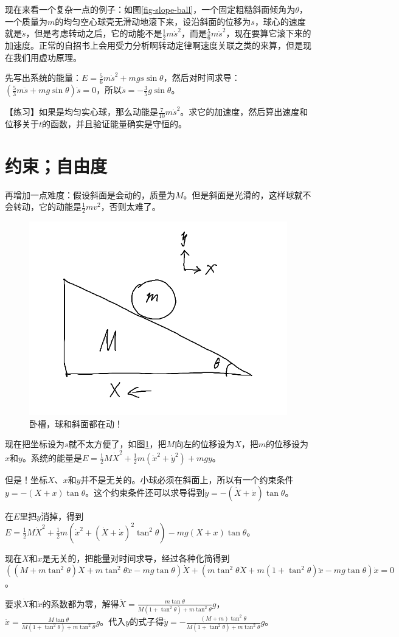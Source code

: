 现在来看一个复杂一点的例子：如图\ref{fig-slope-ball}，一个固定粗糙斜面倾角为$\theta$，一个质量为$m$的均匀空心球壳无滑动地滚下来，设沿斜面的位移为$s$，球心的速度就是$\dot s$，但是考虑转动之后，它的动能不是$\frac{1}{2} m \dot s^2$，而是$\frac{5}{6} m \dot s^2$，现在要算它滚下来的加速度。正常的自招书上会用受力分析啊转动定律啊速度关联之类的来算，但是现在我们用虚功原理。

先写出系统的能量：$E=\frac{5}{6} m \dot s^2+m g s \sin \theta$，然后对时间求导：$(\frac{5}{3} m \ddot s+m g \sin \theta) \dot s=0$，所以$\ddot s=-\frac{3}{5} g \sin \theta$。

【练习】如果是均匀实心球，那么动能是$\frac{7}{10} m \dot s^2$。求它的加速度，然后算出速度和位移关于$t$的函数，并且验证能量确实是守恒的。
\section{约束；自由度}
再增加一点难度：假设斜面是会动的，质量为$M$。但是斜面是光滑的，这样球就不会转动，它的动能是$\frac{1}{2} m v^2$，否则太难了。
\begin{figure}[htb]
\centering
\includegraphics[width=0.33\linewidth]{fig/slope-ball-2.png}
\caption{卧槽，球和斜面都在动！}
\label{fig-slope-ball-2}
\end{figure}

现在把坐标设为$s$就不太方便了，如图\ref{fig-slope-ball-2}，把$M$向左的位移设为$X$，把$m$的位移设为$x$和$y$。系统的能量是$E=\frac{1}{2} M \dot X^2+\frac{1}{2} m (\dot x^2+\dot y^2)+m g y$。

但是！坐标$X$、$x$和$y$并不是无关的。小球必须在斜面上，所以有一个约束条件$y=-(X+x) \tan \theta$。这个约束条件还可以求导得到$\dot y=-(\dot X+\dot x) \tan \theta$。

在$E$里把$y$消掉，得到$E=\frac{1}{2} M \dot X^2+\frac{1}{2} m (\dot x^2+(\dot X+\dot x)^2 \tan^2 \theta)-m g (X+x) \tan \theta$。

现在$X$和$x$是无关的，把能量对时间求导，经过各种化简得到$((M+m \tan^2 \theta) \ddot X+m \tan^2 \theta \ddot x-m g \tan \theta)\dot X+(m \tan^2 \theta \ddot X+m (1+\tan^2 \theta) \ddot x-m g \tan \theta)\dot x=0$。

要求$\dot X$和$\dot x$的系数都为零，解得$\ddot X=\frac{m \tan \theta}{M (1+\tan^2 \theta)+m \tan^2 \theta} g$，$\ddot x=\frac{M \tan \theta}{M (1+\tan^2 \theta)+m \tan^2 \theta} g$。代入$y$的式子得$\ddot y=-\frac{(M+m) \tan^2 \theta}{M (1+\tan^2 \theta)+m \tan^2 \theta} g$。

